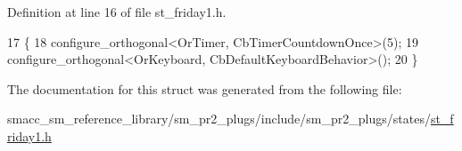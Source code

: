 Definition at line 16 of file st\+\_\+friday1.\+h.


\begin{DoxyCode}
17     \{
18         configure\_orthogonal<OrTimer,  CbTimerCountdownOnce>(5);    
19         configure\_orthogonal<OrKeyboard, CbDefaultKeyboardBehavior>();
20     \}
\end{DoxyCode}


The documentation for this struct was generated from the following file\+:\begin{DoxyCompactItemize}
\item 
smacc\+\_\+sm\+\_\+reference\+\_\+library/sm\+\_\+pr2\+\_\+plugs/include/sm\+\_\+pr2\+\_\+plugs/states/\hyperlink{st__friday1_8h}{st\+\_\+friday1.\+h}\end{DoxyCompactItemize}
